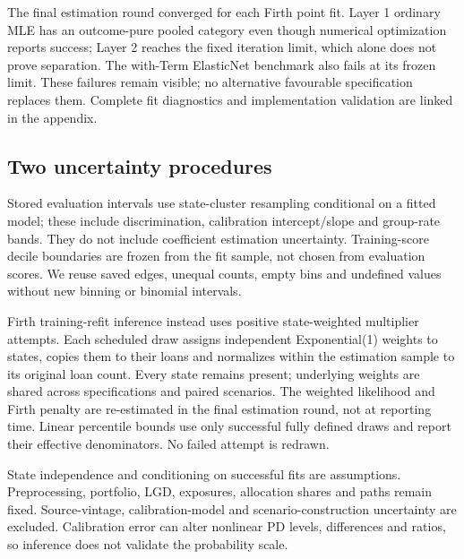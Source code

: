 The final estimation round converged for each Firth point fit. Layer 1 ordinary MLE has an outcome-pure pooled category even though numerical optimization reports success; Layer 2 reaches the fixed iteration limit, which alone does not prove separation. The with-Term ElasticNet benchmark also fails at its frozen limit. These failures remain visible; no alternative favourable specification replaces them. Complete fit diagnostics and implementation validation are linked in the appendix.


\subsection{Two uncertainty procedures}
Stored evaluation intervals use state-cluster resampling conditional on a fitted model; these include discrimination, calibration intercept/slope and group-rate bands. They do not include coefficient estimation uncertainty. Training-score decile boundaries are frozen from the fit sample, not chosen from evaluation scores. We reuse saved edges, unequal counts, empty bins and undefined values without new binning or binomial intervals.

Firth training-refit inference instead uses positive state-weighted multiplier attempts. Each scheduled draw assigns independent Exponential(1) weights to states, copies them to their loans and normalizes within the estimation sample to its original loan count. Every state remains present; underlying weights are shared across specifications and paired scenarios. The weighted likelihood and Firth penalty are re-estimated in the final estimation round, not at reporting time. Linear percentile bounds use only successful fully defined draws and report their effective denominators. No failed attempt is redrawn.


State independence and conditioning on successful fits are assumptions. Preprocessing, portfolio, LGD, exposures, allocation shares and paths remain fixed. Source-vintage, calibration-model and scenario-construction uncertainty are excluded. Calibration error can alter nonlinear PD levels, differences and ratios, so inference does not validate the probability scale.

